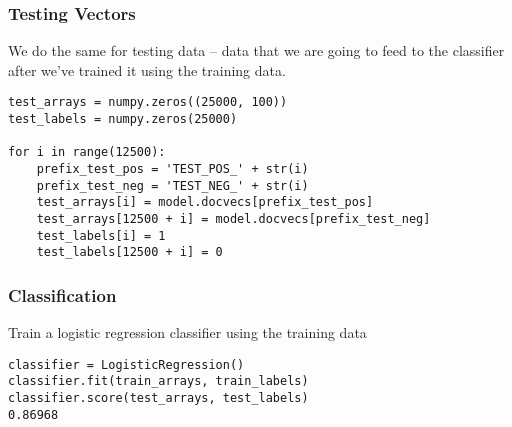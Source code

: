 \begin{frame}[fragile]\frametitle{Testing Vectors}
We do the same for testing data -- data that we are going to feed to the classifier after we've trained it using the training data. 
\begin{lstlisting}
test_arrays = numpy.zeros((25000, 100))
test_labels = numpy.zeros(25000)

for i in range(12500):
    prefix_test_pos = 'TEST_POS_' + str(i)
    prefix_test_neg = 'TEST_NEG_' + str(i)
    test_arrays[i] = model.docvecs[prefix_test_pos]
    test_arrays[12500 + i] = model.docvecs[prefix_test_neg]
    test_labels[i] = 1
    test_labels[12500 + i] = 0
\end{lstlisting}
\end{frame}
\begin{frame}[fragile]\frametitle{Classification}
Train a logistic regression classifier using the training data
\begin{lstlisting}
classifier = LogisticRegression()
classifier.fit(train_arrays, train_labels)
classifier.score(test_arrays, test_labels)
0.86968
\end{lstlisting}
\end{frame}